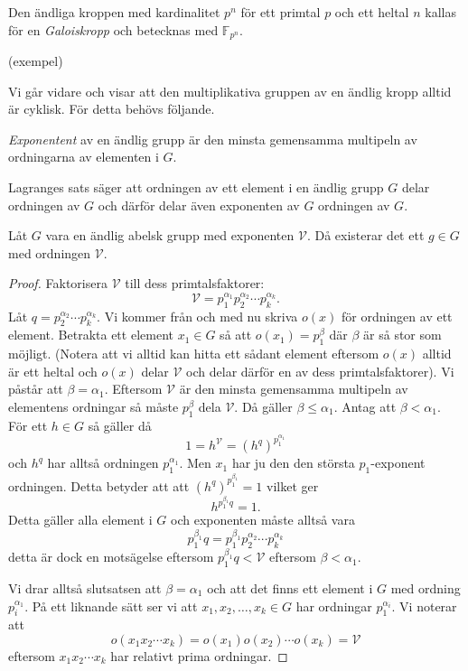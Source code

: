 \documentclass{article}
\theoremstyle{definition}
\begin{document}
\begin{mydef}{}{}
  Den ändliga kroppen med kardinalitet $p^n$ för ett primtal $p$ och ett heltal $n$ kallas för en \textit{Galoiskropp} och betecknas 
  med $\mathbb{F}_{p^n}$.
\end{mydef}

(exempel)

Vi går vidare och visar att den multiplikativa gruppen av en ändlig kropp alltid är cyklisk. För detta behövs följande.
\begin{mydef}{}{}
  \textit{Exponentent} av en ändlig grupp är den minsta gemensamma multipeln av ordningarna av elementen i $G$.
\end{mydef}
Lagranges sats säger att ordningen av ett element i en ändlig grupp $G$ delar ordningen av $G$ och därför delar även 
exponenten av $G$ ordningen av $G$.

\hypertarget{lemma8.0.2}{}
\begin{mylemma}{}{}
  Låt $G$ vara en ändlig abelsk grupp med exponenten $\mathcal{V}$. Då existerar det ett $g \in G$ med ordningen $\mathcal{V}$. 
\end{mylemma}

\begin{proof}
  Faktorisera $\mathcal{V}$ till dess primtalsfaktorer: 
  \[\mathcal{V} = p_1^{\alpha_1}p_2^{\alpha_2} \cdots p_k^{\alpha_k}.\]
  Låt $q = p_2^{\alpha_2} \cdots p_k^{\alpha_k}$.
  Vi kommer från och med nu skriva $o(x)$ för ordningen av ett element. Betrakta ett element $x_1 \in G$ så att $o(x_1) = p_1^\beta$ där $\beta$ 
  är så stor som möjligt.
  (Notera att vi alltid kan hitta ett sådant element eftersom $o(x)$ alltid är ett heltal och $o(x)$ delar $\mathcal{V}$ och delar därför en 
  av dess primtalsfaktorer).
  Vi påstår att $\beta = \alpha_1$. Eftersom $\mathcal{V}$ är den minsta gemensamma multipeln av elementens ordningar 
  så måste $p_1^\beta$ dela $\mathcal{V}$. Då gäller $\beta \leq \alpha_1$. Antag att $\beta < \alpha_1$. För ett $h \in G$ så gäller då 
  \[1 = h^\mathcal{V} = (h^q)^{p_1^{\alpha_1}}\]
  och $h^q$ har alltså ordningen $p_1^{\alpha_1}$. Men $x_1$ har ju den den största $p_1$-exponent ordningen. Detta betyder att
  att $(h^q)^{p_1^{\beta_1}} = 1$ vilket ger 
  \[h^{p_1^{\beta_1}q} = 1.\]
  Detta gäller alla element i $G$ och exponenten måste alltså vara
  \[p_1^{\beta_1}q = p_1^{\beta_1} p_2^{\alpha_2} \cdots p_k^{\alpha_k}\]
  detta är dock en motsägelse eftersom $p_1^{\beta_1}q < \mathcal{V}$ eftersom $\beta < \alpha_1$.

  Vi drar alltså slutsatsen att $\beta = \alpha_1$ och att det finns ett element i $G$ med ordning $p_i^{\alpha_1}$. På ett liknande sätt 
  ser vi att $x_1, x_2, \ldots, x_k \in G$ har ordningar $p_1^{\alpha_i}$. Vi noterar att 
  \[o(x_1x_2 \cdots x_k) = o(x_1)o(x_2) \cdots o(x_k) = \mathcal{V}\]
  eftersom $x_1x_2 \cdots x_k$ har relativt prima ordningar.
\end{proof}
\end{document}
